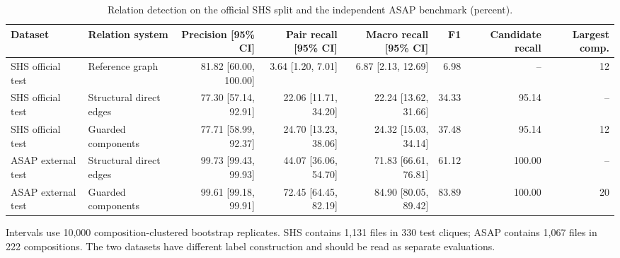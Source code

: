 \begin{table}[t]
\caption{Relation detection on the official SHS split and the independent ASAP benchmark (percent).}
\label{tab:detector-evaluation}
\centering
\scriptsize
\begin{tabular}{llrrrrrr}
\toprule
Dataset & Relation system & Precision [95\% CI] & Pair recall [95\% CI] & Macro recall [95\% CI] & F1 & Candidate recall & Largest comp. \\
\midrule
SHS official test & Reference graph & 81.82 [60.00, 100.00] & 3.64 [1.20, 7.01] & 6.87 [2.13, 12.69] & 6.98 & -- & 12 \\
SHS official test & Structural direct edges & 77.30 [57.14, 92.91] & 22.06 [11.71, 34.20] & 22.24 [13.62, 31.66] & 34.33 & 95.14 & -- \\
SHS official test & Guarded components & 77.71 [58.99, 92.37] & 24.70 [13.23, 38.06] & 24.32 [15.03, 34.14] & 37.48 & 95.14 & 12 \\
ASAP external test & Structural direct edges & 99.73 [99.43, 99.93] & 44.07 [36.06, 54.70] & 71.83 [66.61, 76.81] & 61.12 & 100.00 & -- \\
ASAP external test & Guarded components & 99.61 [99.18, 99.91] & 72.45 [64.45, 82.19] & 84.90 [80.05, 89.42] & 83.89 & 100.00 & 20 \\
\bottomrule
\end{tabular}
\vspace{2pt}
\begin{minipage}{\textwidth}
\footnotesize Intervals use 10,000 composition-clustered bootstrap replicates. SHS contains 1,131 files in 330 test cliques; ASAP contains 1,067 files in 222 compositions. The two datasets have different label construction and should be read as separate evaluations.
\end{minipage}
\end{table}
